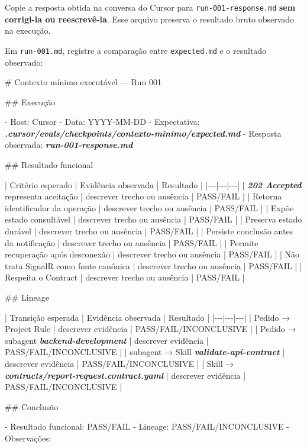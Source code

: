 \documentclass[
  10pt,
  a4paper,
  oneside]{book}
\newenvironment{Shaded}{}{}
\newcommand{\FunctionTok}[1]{\textcolor[rgb]{0.02,0.16,0.49}{#1}}
\newcommand{\InformationTok}[1]{\textcolor[rgb]{0.38,0.63,0.69}{\textbf{\textit{#1}}}}
\newcommand{\NormalTok}[1]{#1}
\newcommand{\SpecialStringTok}[1]{\textcolor[rgb]{0.73,0.40,0.53}{#1}}
\renewenvironment{Shaded}{\begin{snugshade}}{\end{snugshade}}%
\begin{document}
Copie a resposta obtida na conversa do Cursor para
\texttt{run-001-response.md} \textbf{sem corrigi-la ou reescrevê-la}.
Esse arquivo preserva o resultado bruto observado na execução.

Em \texttt{run-001.md}, registre a comparação entre \texttt{expected.md}
e o resultado observado:

\begin{Shaded}
\begin{Highlighting}[]
\FunctionTok{\# Contexto mínimo executável — Run 001}

\FunctionTok{\#\# Execução}

\SpecialStringTok{{-} }\NormalTok{Host: Cursor}
\SpecialStringTok{{-} }\NormalTok{Data: YYYY{-}MM{-}DD}
\SpecialStringTok{{-} }\NormalTok{Expectativa: }\InformationTok{\textasciigrave{}.cursor/evals/checkpoints/contexto{-}minimo/expected.md\textasciigrave{}}
\SpecialStringTok{{-} }\NormalTok{Resposta observada: }\InformationTok{\textasciigrave{}run{-}001{-}response.md\textasciigrave{}}

\FunctionTok{\#\# Resultado funcional}

\NormalTok{| Critério esperado | Evidência observada | Resultado |}
\NormalTok{|{-}{-}{-}|{-}{-}{-}|{-}{-}{-}|}
\NormalTok{| }\InformationTok{\textasciigrave{}202 Accepted\textasciigrave{}}\NormalTok{ representa aceitação | descrever trecho ou ausência | PASS/FAIL |}
\NormalTok{| Retorna identificador da operação | descrever trecho ou ausência | PASS/FAIL |}
\NormalTok{| Expõe estado consultável | descrever trecho ou ausência | PASS/FAIL |}
\NormalTok{| Preserva estado durável | descrever trecho ou ausência | PASS/FAIL |}
\NormalTok{| Persiste conclusão antes da notificação | descrever trecho ou ausência | PASS/FAIL |}
\NormalTok{| Permite recuperação após desconexão | descrever trecho ou ausência | PASS/FAIL |}
\NormalTok{| Não trata SignalR como fonte canônica | descrever trecho ou ausência | PASS/FAIL |}
\NormalTok{| Respeita o Contract | descrever trecho ou ausência | PASS/FAIL |}

\FunctionTok{\#\# Lineage}

\NormalTok{| Transição esperada | Evidência observada | Resultado |}
\NormalTok{|{-}{-}{-}|{-}{-}{-}|{-}{-}{-}|}
\NormalTok{| Pedido → Project Rule | descrever evidência | PASS/FAIL/INCONCLUSIVE |}
\NormalTok{| Pedido → subagent }\InformationTok{\textasciigrave{}backend{-}development\textasciigrave{}}\NormalTok{ | descrever evidência | PASS/FAIL/INCONCLUSIVE |}
\NormalTok{| subagent → Skill }\InformationTok{\textasciigrave{}validate{-}api{-}contract\textasciigrave{}}\NormalTok{ | descrever evidência | PASS/FAIL/INCONCLUSIVE |}
\NormalTok{| Skill → }\InformationTok{\textasciigrave{}contracts/report{-}request.contract.yaml\textasciigrave{}}\NormalTok{ | descrever evidência | PASS/FAIL/INCONCLUSIVE |}

\FunctionTok{\#\# Conclusão}

\SpecialStringTok{{-} }\NormalTok{Resultado funcional: PASS/FAIL}
\SpecialStringTok{{-} }\NormalTok{Lineage: PASS/FAIL/INCONCLUSIVE}
\SpecialStringTok{{-} }\NormalTok{Observações:}
\end{Highlighting}
\end{Shaded}
\end{document}
